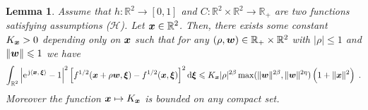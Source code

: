 \documentclass{elsarticle}
\newtheorem{lemma}{Lemma}
\begin{document}
\begin{lemma}\label{lem:2}
Assume that $h : \mathbb{R}^2\to [0,1]$ and $C : \mathbb{R}^2\times \mathbb{R}^2\to \mathbb{R}_+$ are two functions satisfying assumptions ($\mathcal{H}$). Let $\bm{x}\in \mathbb{R}^2$. Then, there exists some constant $K_{\bm{x}}>0$ depending only on $\bm{x}$ such that for any $(\rho,\bm{w})\in \mathbb{R}_+\times \mathbb{R}^2$ with $|\rho|\leq 1$ and $\left\lVert\bm{w}\right\rVert\leqslant 1$ we have
\[
\int_{\mathbb{R}^2}\left|\expj{\ip{\vect{x}}{\vect{\xi}}}-1\right|^2\left[f^{1/2}(\vect{x}+\rho \vect{w},\vect{\xi})-f^{1/2}(\vect{x},\vect{\xi})\right]^2\dif \vect{\xi} \leq K_{\vect{x}}|\rho|^{2\beta}\max(\|\vect{w}\|^{2\beta},\|\vect{w}\|^{2\eta})\left(1+\|\vect{x}\|^2\right)\;.
\]
Moreover the function $\bm{x}\mapsto K_{\bm{x}}$ is bounded on any compact set.
\end{lemma}
\end{document}
